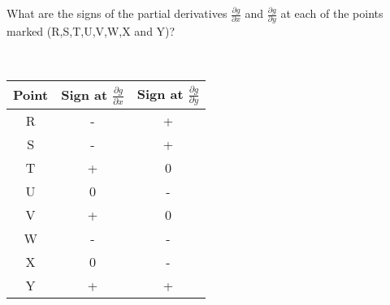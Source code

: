 What are the signs of the partial derivatives $\frac{\partial g}{\partial x}$ and $\frac{\partial g}{\partial y}$ at each of the points marked (R,S,T,U,V,W,X and Y)?

\begin{solution}\
\begin{center}
\begin{tabular}{ c|c|c }
    Point & Sign at $\frac{\partial g}{\partial x}$ & Sign at $\frac{\partial g}{\partial y}$  \\
    \hline
    R & - & + \\
    S & - & + \\
    T & + & 0 \\
    U & 0 & - \\
    V & + & 0 \\
    W & - & - \\
    X & 0 & - \\
    Y & + & + \\
\end{tabular}
\end{center}
\end{solution}